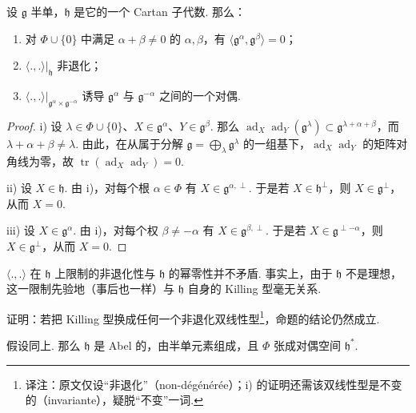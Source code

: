 \begin{proposition}\label{prop:ssl-3-1-2}
设 $\mathfrak g$ 半单，$\mathfrak h$ 是它的一个 Cartan 子代数. 那么：
\begin{enumerate}[label=\roman*)]
\item 对 $\Phi\cup\{0\}$ 中满足 $\alpha+\beta\neq 0$ 的 $\alpha,\beta$，有 $\langle\mathfrak g^\alpha,\mathfrak g^\beta\rangle=0$；
\item $\langle.,.\rangle|_{\mathfrak h}$ 非退化；
\item $\langle.,.\rangle|_{\mathfrak g^\alpha\times\mathfrak g^{-\alpha}}$ 诱导 $\mathfrak g^\alpha$ 与 $\mathfrak g^{-\alpha}$ 之间的一个对偶.
\end{enumerate}
\end{proposition}
\begin{proof}
i) 设 $\lambda\in\Phi\cup\{0\}$、$X\in\mathfrak g^\alpha$、$Y\in\mathfrak g^\beta$. 那么 $\operatorname{ad}_X\operatorname{ad}_Y(\mathfrak g^\lambda)\subset\mathfrak g^{\lambda+\alpha+\beta}$，而 $\lambda+\alpha+\beta\neq\lambda$. 由此，在从属于分解 $\mathfrak g=\bigoplus_\lambda\mathfrak g^\lambda$ 的一组基下，$\operatorname{ad}_X\operatorname{ad}_Y$ 的矩阵对角线为零，故 $\operatorname{tr}(\operatorname{ad}_X\operatorname{ad}_Y)=0$.

ii) 设 $X\in\mathfrak h$. 由 i)，对每个根 $\alpha\in\Phi$ 有 $X\in\mathfrak g^{\alpha,\perp}$. 于是若 $X\in\mathfrak h^\perp$，则 $X\in\mathfrak g^\perp$，从而 $X=0$.

iii) 设 $X\in\mathfrak g^\alpha$. 由 i)，对每个权 $\beta\neq-\alpha$ 有 $X\in\mathfrak g^{\beta,\perp}$. 于是若 $X\in\mathfrak g^{\perp-\alpha}$，则 $X\in\mathfrak g^\perp$，从而 $X=0$.
\end{proof}
\begin{remark*}
$\langle.,.\rangle$ 在 $\mathfrak h$ 上限制的非退化性与 $\mathfrak h$ 的幂零性并不矛盾. 事实上，由于 $\mathfrak h$ 不是理想，这一限制先验地（事后也一样）与 $\mathfrak h$ 自身的 Killing 型毫无关系.
\end{remark*}
\begin{exercise*}
证明：若把 Killing 型换成任何一个非退化双线性型\footnote{译注：原文仅设``非退化''（non-d\'eg\'en\'er\'ee）；i) 的证明还需该双线性型是不变的（invariante），疑脱``不变''一词.}，命题的结论仍然成立.
\end{exercise*}
\begin{corollary*}
假设同上. 那么 $\mathfrak h$ 是 Abel 的，由半单元素组成，且 $\Phi$ 张成对偶空间 $\mathfrak h^*$.
\end{corollary*}
